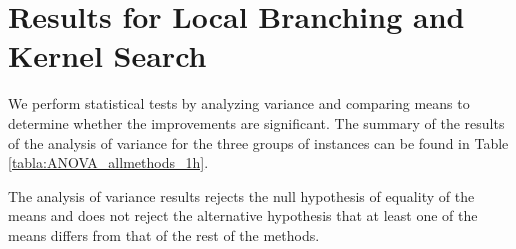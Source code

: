 \setcounter{table}{0}
\setcounter{figure}{0}
\renewcommand{\thetable}{B\arabic{table}}
\renewcommand{\thefigure}{B\arabic{figure}}
\section{Results for Local Branching and Kernel Search}\label{app:appB}


We perform statistical tests by analyzing variance and comparing means to determine whether the improvements are significant. The summary of the results of the analysis of variance for the three groups of instances can be found in Table \ref{tabla:ANOVA_allmethods_1h}.

\begin{table}[!htp]\centering
\caption{Analysis of variance summary for LB1\_1h, LB2\_1h, LB3\_1h, LB4\_1h, KS\_1h, SM1\_1h, SM2\_1h under a running time limit of 4000 seconds.}\label{tabla:ANOVA_allmethods_1h}
\scriptsize
{}
\end{table}

The analysis of variance results rejects the null hypothesis of equality of the means and does not reject the alternative hypothesis that at least one of the means differs from that of the rest of the methods.

